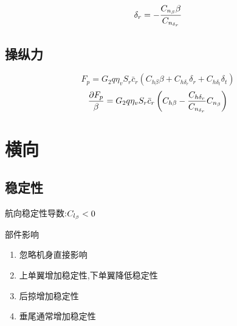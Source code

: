 $$\delta_r=-\frac{C_{n_\beta} \beta}{C_{n_{\delta_r}}}$$

\subsection{操纵力}
$$F_p=G_2q\eta_vS_r\bar{c}_r(C_{h\beta}\beta+C_{h\delta_r}\delta_r+C_{h\delta_t}\delta_t)$$
$$\frac{\partial F_p}{\beta}=G_2q\eta_vS_r\bar{c}_r\left( C_{h\beta}-\frac{C_{h\delta_r}}{C_{n_{\delta_r}}}C_{n_\beta}\right)$$

\section{横向}
\subsection{稳定性}
航向稳定性导数:$C_{l_\beta}<0$

部件影响
\begin{enumerate}[label=\arabic*.,topsep=0pt]
\setlength{\itemsep}{-2pt}
\item 忽略机身直接影响
\item 上单翼增加稳定性,下单翼降低稳定性
\item 后掠增加稳定性
\item 垂尾通常增加稳定性

\end{enumerate}

\endinput
